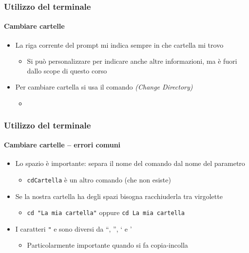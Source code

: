 \begin{contentframe}
    \frametitle{Utilizzo del terminale}
    \framesubtitle{Cambiare cartelle}

    \begin{itemize}
        \item La riga corrente del prompt mi indica sempre in che cartella mi trovo
        \begin{itemize}
            \item Si può personalizzare per indicare anche altre informazioni, ma è fuori dallo scope di questo corso 
        \end{itemize}
        
        \bigskip
        \item Per cambiare cartella si usa il comando  \textit{(Change Directory)}
        \begin{itemize}
            \item {}
            
        \end{itemize}
    \end{itemize}
\end{contentframe}

\begin{exampleframe}
    \frametitle{Utilizzo del terminale}
    \framesubtitle{Cambiare cartelle -- errori comuni}

    \centering
    \bigskip
    
    \begin{itemize}
        \item Lo spazio è importante: separa il nome del comando dal nome del parametro
        \begin{itemize}
            \item \texttt{cdCartella} è un altro comando (che non esiste)
        \end{itemize}
        \bigskip
        
        \item Se la nostra cartella ha degli spazi bisogna racchiuderla tra virgolette
        \begin{itemize}
            \item \texttt{cd "La mia cartella"} oppure \texttt{cd \textquotesingle{}La mia cartella\textquotesingle{}} 
        \end{itemize}
        
        \bigskip
        \item I caratteri \texttt{"} e \texttt{\textquotesingle{}} sono diversi da ``, '', ` e '
        \begin{itemize}
            \item Particolarmente importante quando si fa copia-incolla
        \end{itemize}
    \end{itemize}
\end{exampleframe}

